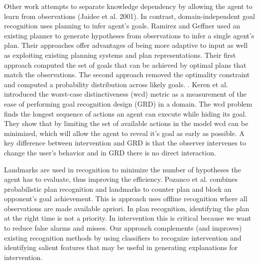\documentclass[letterpaper]{article}
\theoremstyle{plain}
\begin{document}
Other work attempts to separate knowledge dependency by allowing the agent to learn from observations (Jaidee et al. 2001)\nocite{jaidee2011gda}. In contrast, domain-independent goal recognition uses planning to infer agent’s goals. Ramirez and Geffner  used an existing planner to generate hypotheses from observations to infer a single agent's plan. Their approaches offer advantages of being more adaptive to input as well as exploiting existing planning systems and plan representations. Their first approach computed the set of goals that can be achieved by optimal plans that match the observations. The second approach removed the optimality constraint and computed a probability distribution across likely goals. \cite{ramirez2010probabilistic}. Keren et al.  introduced the worst-case distinctiveness (wcd) metric as a measurement of the ease of performing goal recognition design (GRD) in a domain. The wcd problem finds the longest sequence of actions an agent can execute while hiding its goal. They show that by limiting the set of available actions in the model wcd can be minimized, which will allow the agent to reveal it's goal as early as possible. A key difference between intervention and GRD is that the observer intervenes to change the user's behavior and in GRD there is no direct interaction.


Landmarks are used in recognition to minimize the number of hypotheses the agent has to evaluate, thus improving the efficiency. Pozanco et al.  combines probabilistic plan recognition and landmarks to counter plan and block an opponent's goal achievement. This is approach uses offline recognition where all observations are made available apriori. In plan recognition, identifying the plan at the right time is not a priority. In intervention this is critical because we want to reduce false alarms and misses. Our approach complements (and improves) existing recognition methods by using classifiers to recognize intervention and identifying salient features that may be useful in generating explanations for intervention.
\end{document}
